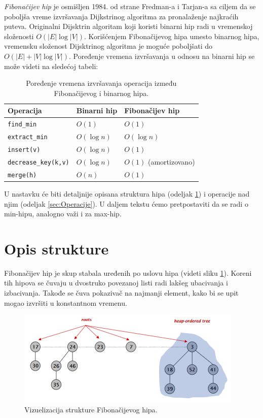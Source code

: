 \documentclass[a4paper]{article}
\theoremstyle{plain}
\theoremstyle{definition}
\begin{document}
\emph{Fibona\v{c}ijev hip} \cite{Book} je osmi\v{s}ljen 1984. od strane Fredman-a i Tarjan-a sa ciljem da se pobolj\v{s}a vreme izvr\v{s}avanja Dijkstrinog algoritma za pronala\v{z}enje najkra\'c{}ih puteva. Originalni Dijsktrin algoritam koji koristi binarni hip radi u vremenskoj slo\v{z}enosti $O(|E|\log{|V|})$. Kori\v{s}\'c{}enjem Fibona\v{c}ijevog hipa umesto binarnog hipa, vremensku slo\v{z}enost Dijsktrinog algoritma je mogu\'c{}e pobolj\v{s}ati do $O(|E| + |V|\log{|V|})$. Poređenje vremena izvr\v{s}avanja u odnosu na binarni hip se mo\v{z}e videti na slede\'c{}oj tabeli:

\begin{table}[H]
\centering
\begin{tabular}{|l|l|l|}
    \hline
    Operacija                   & Binarni hip  & Fibona\v{c}ijev hip \\
    \hline
    \texttt{find\_min}          & $O(1)$       & $O(1)$              \\
    \texttt{extract\_min}       & $O(\log{n})$ & $O(\log{n})$        \\
    \texttt{insert(v)}          & $O(\log{n})$ & $O(1)$              \\
    \texttt{decrease\_key(k,v)} & $O(\log{n})$ & $O(1)$ (amortizovano) \\
    \texttt{merge(h)}           & $O(n)$       & $O(1)$              \\
    \hline
\end{tabular}
\label{tbl:fig1}
\caption{Poređenje vremena izvr\v{s}avanja operacija između Fibona\v{c}ijevog i binarnog hipa.}
\end{table}

U nastavku \'{c}e biti detaljnije opisana struktura hipa (odeljak \ref{sec:Struktura}) i operacije nad njim (odeljak \ref{sec:Operacije}). U daljem tekstu \'c{}emo pretpostaviti da se radi o min-hipu, analogno va\v{z}i i za max-hip.


\section{Opis strukture}
\label{sec:Struktura}

Fibona\v{c}ijev hip je skup stabala uređenih po uslovu hipa (videti sliku \ref{fig1}). Koreni tih hipova se \v{c}uvaju u dvostruko povezanoj listi radi lak\v{s}eg ubacivanja i izbacivanja. Takođe se \v{c}uva pokaziva\v{c} na najmanji element, kako bi se upit mogao izvr\v{s}iti u konstantnom vremenu. 

\begin{figure}[H]
    \centering
    \includegraphics[scale=0.8]{resources/fig1.PNG}
    \caption{Vizuelizacija strukture Fibona\v{c}ijevog hipa.}
    \label{fig1}
\end{figure}
\end{document}
